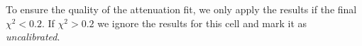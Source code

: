 \documentclass[12pt,a4paper]{article}
\begin{document}
To ensure the quality of the attenuation fit, we only apply the results if the final $\chi^2<0.2$. If $\chi^2>0.2$ we ignore the results for this cell and mark it as \textit{uncalibrated}.



\end{document}
